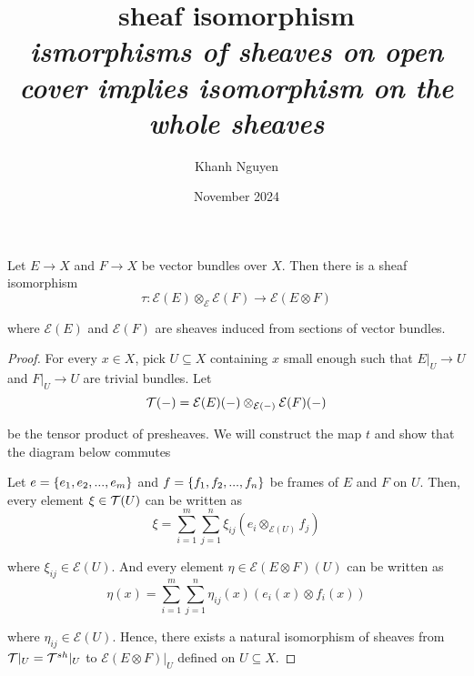 \documentclass{article}
\title{
	sheaf isomorphism \\
	\small \emph{ismorphisms of sheaves on open cover implies isomorphism on the whole sheaves}
}
\author{Khanh Nguyen}
\date{November 2024}
\begin{document}
	
\maketitle

\begin{lemma}
    Let $E \to X$ and $F \to X$ be vector bundles over $X$. Then there is a sheaf isomorphism
    $$
        \tau: \mathcal{E}(E) \otimes_\mathcal{E} \mathcal{E}(F) \to \mathcal{E}(E \otimes F)
    $$

    where $\mathcal{E}(E)$ and $\mathcal{E}(F)$ are sheaves induced from sections of vector bundles.
\begin{proof}
    For every $x \in X$, pick $U \subseteq X$ containing $x$ small enough such that $E\vert_U \to U$ and $F\vert_U \to U$ are trivial bundles. Let 
    $$
        \mathcal{T}(-) = \mathcal{E}(E)(-) \otimes_{\mathcal{E}(-)} \mathcal{E}(F)(-)
    $$

    be the tensor product of presheaves. We will construct the map $t$ and show that the diagram below commutes
    \begin{center}
    \end{center}

    Let $e = \{e_1, e_2, ..., e_m\}$ and $f = \{f_1, f_2, ..., f_n\}$ be frames of $E$ and $F$ on $U$. Then, every element $\xi \in \mathcal{T}(U)$ can be written as
    $$
        \xi = \sum_{i=1}^m \sum_{j=1}^n \xi_{ij} (e_i \otimes_{\mathcal{E}(U)} f_j)
    $$

    where $\xi_{ij} \in \mathcal{E}(U)$. And every element $\eta \in \mathcal{E}(E \otimes F)(U)$ can be written as
    $$
        \eta(x) = \sum_{i=1}^m \sum_{j=1}^n \eta_{ij}(x) (e_i(x) \otimes f_i(x))
    $$

    where $\eta_{ij} \in \mathcal{E}(U)$. Hence, there exists a natural isomorphism of sheaves from $\mathcal{T}\vert_U = \mathcal{T}^{sh}\vert_U$ to $\mathcal{E}(E \otimes F)\vert_U$ defined on $U \subseteq X$.


\end{proof}
\end{lemma}
\end{document}
